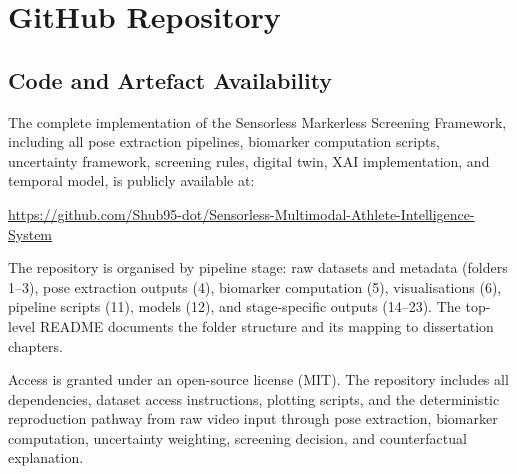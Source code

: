 \chapter{GitHub Repository}
\label{app:github}

\section{Code and Artefact Availability}

The complete implementation of the Sensorless Markerless Screening Framework, including all pose extraction pipelines, biomarker computation scripts, uncertainty framework, screening rules, digital twin, XAI implementation, and temporal model, is publicly available at:

\begin{center}
\url{https://github.com/Shub95-dot/Sensorless-Multimodal-Athlete-Intelligence-System}
\end{center}

The repository is organised by pipeline stage: raw datasets and metadata (folders 1--3), pose extraction outputs (4), biomarker computation (5), visualisations (6), pipeline scripts (11), models (12), and stage-specific outputs (14--23). The top-level README documents the folder structure and its mapping to dissertation chapters.

Access is granted under an open-source license (MIT). The repository includes all dependencies, dataset access instructions, plotting scripts, and the deterministic reproduction pathway from raw video input through pose extraction, biomarker computation, uncertainty weighting, screening decision, and counterfactual explanation.
